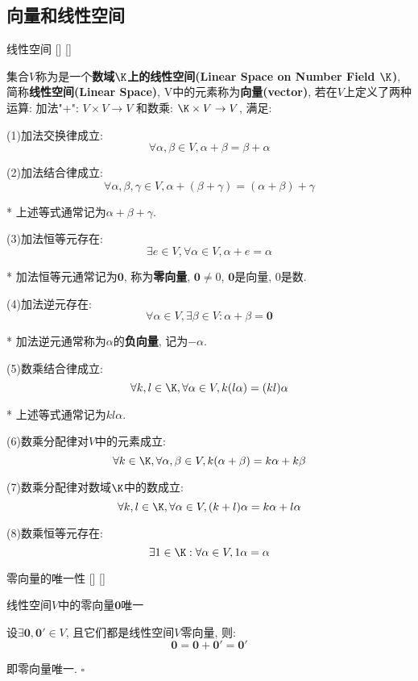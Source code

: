 \documentclass[UTF8]{ctexart}
\begin{document}
	\subsection{向量和线性空间}
		\begin{dfn}
			[]
			{线性空间}
			[]
			[]

			集合$V$称为是一个\textbf{数域$\K$上的线性空间(Linear Space on Number Field $\K$)}, 简称\textbf{线性空间(Linear Space)}, V中的元素称为\textbf{向量(vector)}, 若在$V$上定义了两种运算: 加法"+": $V\times V\to V$ 和数乘: $\K\times V \to V$, 满足:

			(1)加法交换律成立: 
			\[\forall \alpha,\beta \in V, \alpha+\beta=\beta+\alpha\]

			(2)加法结合律成立: 
			\[\forall \alpha,\beta, \gamma \in V, \alpha+(\beta+\gamma)=(\alpha+\beta)+\gamma\]
			
			* 上述等式通常记为$\alpha+\beta+\gamma$. 

			(3)加法恒等元存在: 
			\[\exists e\in V, \forall \alpha \in V, \alpha +e=\alpha\]
			
			* 加法恒等元通常记为$\mathbf{0}$, 称为\textbf{零向量}, $\mathbf{0}\neq 0$, $\mathbf{0}$是向量, $0$是数. 

			(4)加法逆元存在: 
			\[\forall \alpha \in V, \exists \beta \in V: \alpha+\beta=\mathbf{0}\]
			
			* 加法逆元通常称为$\alpha$的\textbf{负向量}, 记为$-\alpha$. 

			(5)数乘结合律成立: 
			\[\forall k,l\in \K, \forall \alpha \in V, k(l\alpha) =(kl)\alpha\]
			
			* 上述等式通常记为$kl\alpha$. 

			(6)数乘分配律对$V$中的元素成立: 
			\[\forall k\in \K, \forall \alpha , \beta \in V, k(\alpha +\beta)=k\alpha+k\beta\]

			(7)数乘分配律对数域$\K$中的数成立: 
			\[\forall k,l\in \K, \forall \alpha \in V, (k+l)\alpha =k\alpha +l\alpha\]
			
			(8)数乘恒等元存在: 
			\[\exists 1\in \K: \forall \alpha \in V, 1\alpha=\alpha\]
		\end{dfn}
		
		\begin{ppt}
			[]
			{零向量的唯一性}
			[]
			[]

			线性空间$V$中的零向量$\mathbf{0}$唯一
		\end{ppt}
        \begin{prf}设$\exists \mathbf{0}, \mathbf{0}' \in V$, 且它们都是线性空间$V$零向量, 则: 
			\[\mathbf{0}=\mathbf{0}+\mathbf{0}'=\mathbf{0}'\]
			
			即零向量唯一. $\square$ 
        \end{prf}
		
\end{document}
